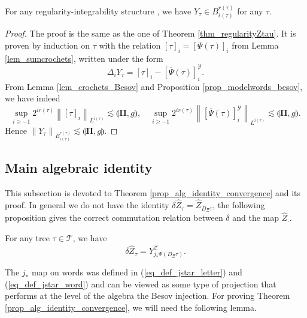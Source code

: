 \documentclass[11pt]{preprint}
\newcommand{\mcB}{\mathcal{B}}
\newcommand{\mcY}{\mathcal{Y}}
\newcommand{\mcD}{\mathcal{D}}
\newcommand{\mcZ}{\mathcal{Z}}
\newcommand{\mcT}{\mathcal{T}}
\newcounter{theorem}
\def\PPi{\boldsymbol{\Pi}}
\def\eqref#1{(\ref{#1})}
\newcommand{\bfR}{\mathbf{R}}
\newcommand{\norme}[1]{\left\lVert #1 \right\lVert}
\begin{document}
\begin{proposition}\label{prop_regularity_Y_Besov}
	For any regularity-integrability structure , we have $Y_\tau\in B^{r(\tau)}_{i(\tau)}$ for any $\tau$.
\end{proposition}

\begin{proof}
	The proof is the same as the one of Theorem \ref{thm_regularityZtau}. It is proven by induction on $\tau$ with the relation $[\tau]_i=[\Psi(\tau)]_i$ from Lemma \ref{lem_sumcrochets}, written under the form
	$$
	\Delta_i Y_\tau = [\tau]_i - [\overline{\Psi}(\tau)]^\mcY_i.
	$$
	From Lemma \ref{lem_crochets_Besov} and Proposition \ref{prop_modelwords_besov}, we have indeed 
	$$
		\sup_{i\geq-1}2^{ir(\tau)}\norme{[\tau]_i}_{L^{i(\tau)}} \lesssim  \llparenthesis \PPi , g\rrparenthesis, \quad
		\sup_{i\geq-1}2^{ir(\tau)}\norme{[\overline{\Psi}(\tau)]^\mcY_i}_{L^{i(\tau)}} \lesssim  \llparenthesis \PPi , g\rrparenthesis.
	$$
	Hence $\norme{Y_\tau}_{B^{r(\tau)}_{i(\tau)}}\lesssim  \llparenthesis \PPi , g\rrparenthesis.  $
\end{proof}

%
%


\subsection{Main algebraic identity}

This subsection is devoted to Theorem \ref{prop_alg_identity_convergence} and its proof.
In general we do not have the identity $\delta \widehat{Z}_\tau=\widehat{Z}_{D_{\Xi}\tau}$, the following proposition gives the correct commutation relation between $\delta$ and the map $\widehat{Z}_{\cdot}$.


\begin{theorem}\label{prop_alg_identity_convergence}
	For any tree $\tau\in\mcT$, we have 
	$$
	\delta \widehat{Z}_\tau = Y^{\widehat{\mcZ}}_{j_*\Psi(D_\Xi\tau)}.
	$$
\end{theorem}
The $j_*$ map on words was defined in \eqref{eq_def_jstar_letter} and \eqref{eq_def_jstar_word} and can be viewed as some type of projection that performs at the level of the algebra the Besov injection. 
For proving Theorem \ref{prop_alg_identity_convergence}, we  will need the following lemma.
\end{document}
